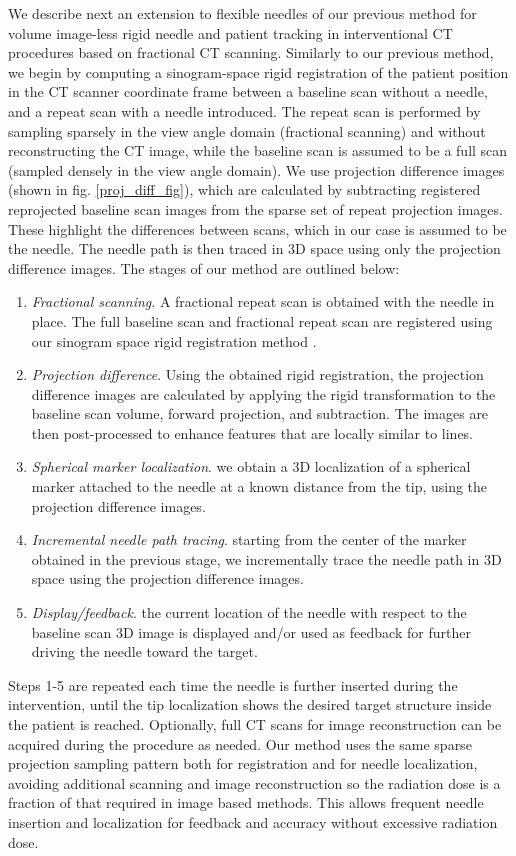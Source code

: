 \documentclass[letterpaper, 11 pt, conference]{ieeeconf}  %
\begin{document}
We describe next an extension to flexible needles of our previous method \cite{medan2017reduced} for volume image-less rigid needle and patient tracking in interventional CT procedures based on fractional CT scanning. Similarly to our previous method, we begin by computing a sinogram-space rigid registration of the patient position in the CT scanner coordinate frame between a baseline scan without a needle, and a repeat scan with a needle introduced. The repeat scan is performed by sampling sparsely in the view angle domain (fractional scanning) and without reconstructing the CT image, while the baseline scan is assumed to be a full scan (sampled densely in the view angle domain). We use projection difference images (shown in fig. \ref{proj_diff_fig}), which are calculated by subtracting registered reprojected baseline scan images from the sparse set of repeat projection images. These highlight the differences between scans, which in our case is assumed to be the needle. The needle path is then traced in 3D space using only the projection difference images. The stages of our method are outlined below:
\begin{enumerate}
\item \textit{Fractional scanning}. A fractional repeat scan is obtained with the needle in place. The full baseline scan and fractional repeat scan are registered using our sinogram space rigid registration method \cite{medan2017sparse}.
\item \textit{Projection difference}. Using the obtained rigid registration, the projection difference images are calculated by applying the rigid transformation to the baseline scan volume, forward projection, and subtraction. The images are then post-processed to enhance features that are locally similar to lines.
\item \textit{Spherical marker localization}. we obtain a 3D localization of a spherical marker attached to the needle at a known distance from the tip, using the projection difference images.
\item \textit{Incremental needle path tracing}. starting from the center of the marker obtained in the previous stage, we incrementally trace the needle path in 3D space using the projection difference images.
\item \textit{Display/feedback}. the current location of the needle with respect to the baseline scan 3D image is displayed and/or used as feedback for further driving the needle toward the target.
\end{enumerate}
Steps 1-5 are repeated each time the needle is further inserted during the intervention, until the tip localization shows the desired target structure inside the patient is reached. Optionally, full CT scans for image reconstruction can be acquired during the procedure as needed. Our method uses the same sparse projection sampling pattern both for registration and for needle localization, avoiding additional scanning and image reconstruction so the radiation dose is a fraction of that required in image based methods. This allows frequent needle insertion and localization for feedback and accuracy without excessive radiation dose.
\end{document}
